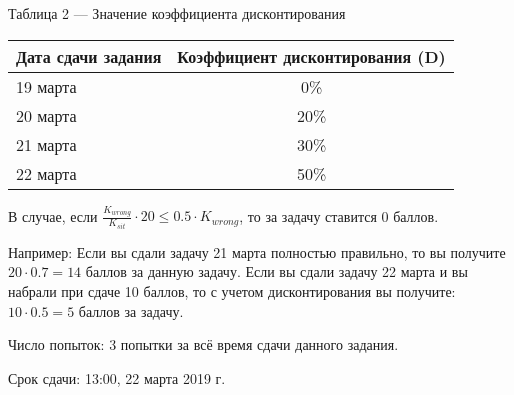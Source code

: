 \begin{table}[H]
    Таблица 2 — Значение коэффициента дисконтирования
    
    \begin{tabular}{|l|c|}
    \hline
    Дата сдачи задания & Коэффициент дисконтирования (D) \\
    \hline
    19 марта & 0\% \\
    20 марта & 20\% \\
    21 марта & 30\% \\
    22 марта & 50\% \\
    \hline
    \end{tabular}
\end{table}

В случае, если $\frac{K_{wrong}}{K_{sit}} \cdot 20 \leq 0.5\cdot K_{wrong}$, то за задачу ставится 0 баллов.

Например:  
Если вы сдали задачу 21 марта полностью правильно, то вы получите $20 \cdot 0.7 = 14$ баллов за данную задачу. 
Если вы сдали задачу 22 марта и вы набрали при сдаче 10 баллов, то с учетом дисконтирования вы получите: $10 \cdot 0.5 = 5$ баллов за задачу.

Число попыток: 3 попытки за всё время сдачи данного задания.

Срок сдачи: 13:00, 22 марта 2019 г.